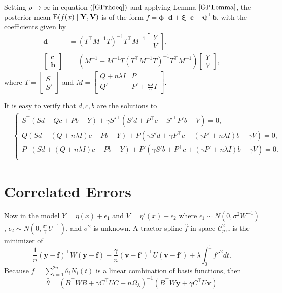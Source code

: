 Setting $\rho \rightarrow \infty$ in equation $(\ref{GPrhoeq})$ and applying Lemma $\ref{GPLemma}$, the posterior mean $\mathrm{E} (f(x)\mid \mathbf{Y},\mathbf{V})$ is of the form $f  = \mathbf{\phi}^\top \mathbf{d}+\mathbf{\xi}^\top \mathbf{c}+\mathbf{\psi}^\top \mathbf{b}$, with the coefficients given by
\begin{align*} 
\mathbf{d}&=(T^\top M^{-1}T)^{-1}T^\top M^{-1}\begin{bmatrix}Y\\V \end{bmatrix},\\
\begin{bmatrix}\mathbf{c}\\\mathbf{b}\end{bmatrix} &=
(M^{-1}-M^{-1}T(T^\top M^{-1} T)^{-1}T^\top M^{-1})\begin{bmatrix}Y\\V \end{bmatrix},
\end{align*} where $T=\begin{bmatrix} S\\S' \end{bmatrix}$ and $M=\begin{bmatrix}
Q+n\lambda I& P\\
Q'& P'+\frac{n\lambda}{\gamma}I
\end{bmatrix}$.


It is easy to verify that $d,c,b$ are the solutions to
\begin{align*}
&\begin{cases}
S^\top (Sd +Qc+Pb-Y) +\gamma S'^\top( S'd+ P^\top c+S'^\top P'b-V)=0, \\
Q(Sd+(Q+n\lambda I)c+Pb-Y) + P ( \gamma S'd +  \gamma P^\top c+ (\gamma P'+n\lambda I) b- \gamma V)=0, \\
P^\top (Sd+(Q+n\lambda I) c +Pb-Y)+P'(\gamma S'b+P^\top c +(\gamma P'+n\lambda I)b- \gamma V)=0. \\
\end{cases}
\end{align*}


\section{Correlated Errors}

Now in the model $Y=\eta(x)+\epsilon_1$ and $V=\eta'(x)+\epsilon_2$ where $\epsilon_1\sim N(0,\sigma^2W^{-1})$, $\epsilon_2\sim N(0,\frac{\sigma^2}{\gamma}U^{-1})$, and $\sigma^2$ is unknown. A tractor spline $\hat{f}$ in space $\mathcal{C}_{p.w}^2$ is the minimizer of
\begin{equation}
\frac{1}{n}(\mathbf{y}-\mathbf{f})^\top W(\mathbf{y}-\mathbf{f})+\frac{\gamma}{n}(\mathbf{v}-\mathbf{f}')^\top U(\mathbf{v}-\mathbf{f}')+\lambda\int_0^1f''^2dt.
\end{equation}
Because $f=\sum_{i=1}^{2n}\theta_iN_i(t)$ is a linear combination of basis functions, then
\begin{equation}
\hat{\theta}=(B^\top W B+ \gamma C^\top UC+n\Omega_\lambda)^{-1}(B^\top W \mathbf{y}+\gamma C^\top U\mathbf{v})
\end{equation}

